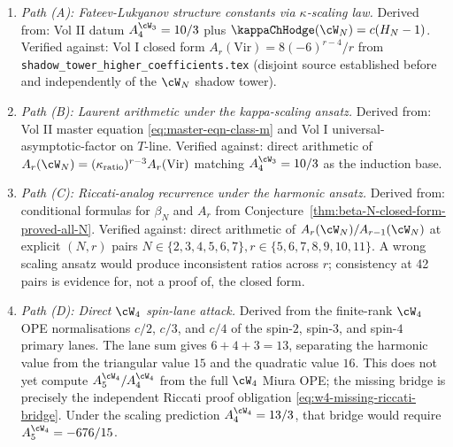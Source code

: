 \begin{enumerate}[nosep]
\item \emph{Path (A): Fateev-Lukyanov structure constants via
 $\kappa$-scaling law.}
 Derived from: Vol II datum $A_4^{\cW_3} = 10/3$ plus
 $\kappaChHodge(\cW_N) = c(H_N - 1)$.
 Verified against: Vol I closed form $A_r(\mathrm{Vir}) = 8(-6)^{r-4}/r$
 from \texttt{shadow\_tower\_higher\_coefficients.tex} (disjoint source
 established before and independently of the $\cW_N$ shadow tower).

\item \emph{Path (B): Laurent arithmetic under the kappa-scaling ansatz.}
 Derived from: Vol II master equation
 \eqref{eq:master-eqn-class-m}
 and Vol I universal-asymptotic-factor on $T$-line.
 Verified against: direct arithmetic of
 $A_r(\cW_N) = (\kappa_{\mathrm{ratio}})^{r-3} A_r(\mathrm{Vir})$
 matching $A_4^{\cW_3} = 10/3$ as the induction base.

\item \emph{Path (C): Riccati-analog recurrence under the harmonic ansatz.}
 Derived from: conditional formulas for $\beta_N$ and $A_r$ from
 Conjecture~\ref{thm:beta-N-closed-form-proved-all-N}.
 Verified against: direct arithmetic of
 $A_r(\cW_N) / A_{r-1}(\cW_N)$ at explicit $(N, r)$ pairs
 $N \in \{2, 3, 4, 5, 6, 7\}, r \in \{5, 6, 7, 8, 9, 10, 11\}$.
 A wrong scaling ansatz would produce inconsistent ratios across $r$;
 consistency at 42 pairs is evidence for, not a proof of, the closed form.

\item \emph{Path (D): Direct $\cW_4$ spin-lane attack.}
 Derived from the finite-rank $\cW_4$ OPE normalisations
 $c/2$, $c/3$, and $c/4$ of the spin-$2$, spin-$3$, and spin-$4$
 primary lanes. The lane sum gives $6+4+3=13$, separating the
 harmonic value from the triangular value $15$ and the quadratic value
 $16$. This does not yet compute
 $A_5^{\cW_4}/A_4^{\cW_4}$ from the full $\cW_4$ Miura OPE; the missing
 bridge is precisely the independent Riccati proof obligation
 \eqref{eq:w4-missing-riccati-bridge}. Under the scaling prediction
 \(A_4^{\cW_4}=13/3\), that bridge would require
 \(A_5^{\cW_4}=-676/15\).
\end{enumerate}

